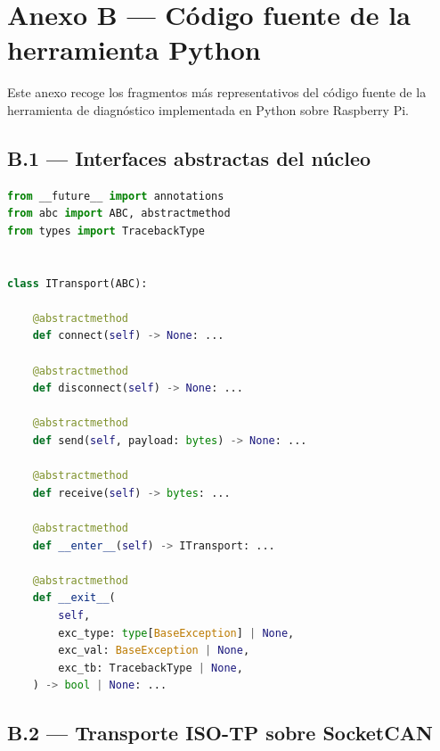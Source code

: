 \chapter*{Anexo B — Código fuente de la herramienta Python}
\label{anexo:python}

Este anexo recoge los fragmentos más representativos del código fuente de la
herramienta de diagnóstico implementada en Python sobre Raspberry Pi.

\section*{B.1 — Interfaces abstractas del núcleo}

\begin{lstlisting}[language=Python, caption={Interfaz ITransport — contrato de la capa de transporte}]
from __future__ import annotations
from abc import ABC, abstractmethod
from types import TracebackType


class ITransport(ABC):

    @abstractmethod
    def connect(self) -> None: ...

    @abstractmethod
    def disconnect(self) -> None: ...

    @abstractmethod
    def send(self, payload: bytes) -> None: ...

    @abstractmethod
    def receive(self) -> bytes: ...

    @abstractmethod
    def __enter__(self) -> ITransport: ...

    @abstractmethod
    def __exit__(
        self,
        exc_type: type[BaseException] | None,
        exc_val: BaseException | None,
        exc_tb: TracebackType | None,
    ) -> bool | None: ...
\end{lstlisting}

\section*{B.2 — Transporte ISO-TP sobre SocketCAN}

